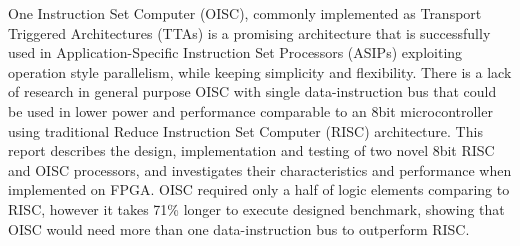 \iffalse
The abstract is written last and summarises the important points you are making in the report using one sentence for each point:

* What is the topic of the work? What is the goal?
* Why are you doing it? What are your motivations?
* Does this work appear in the literature and if so, what are you doing differently?
* What is the most significant result? Was it unexpected? What impact will it have?
\fi

One Instruction Set Computer (OISC), commonly implemented as Transport Triggered Architectures (TTAs) is a promising architecture that is successfully used in Application-Specific Instruction Set Processors (ASIPs) exploiting operation style parallelism, while keeping simplicity and flexibility. There is a lack of research in general purpose OISC with single data-instruction bus that could be used in lower power and performance comparable to an 8bit microcontroller using traditional Reduce Instruction Set Computer (RISC) architecture. This report describes the design, implementation and testing of two novel 8bit RISC and OISC processors, and investigates their characteristics and performance when implemented on FPGA. OISC required only a half of logic elements comparing to RISC, however it takes 71\% longer to execute designed benchmark, showing that OISC would need more than one data-instruction bus to outperform RISC.
